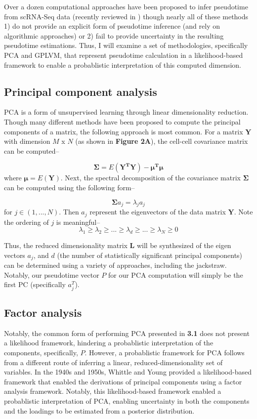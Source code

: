 \documentclass[english, 11pt]{article}\usepackage[]{graphicx}\usepackage[]{color}
\begin{document}
Over a dozen computational approaches have been proposed to infer pseudotime from scRNA-Seq data (recently reviewed in \cite{cannoodt2016computational}) though nearly all of these methods 1) do not provide an explicit form of pseudotime inference (and rely on algorithmic approaches) or 2) fail to provide uncertainty in the resulting pseudotime estimations. Thus, I will examine a set of methodologies, specifically PCA and GPLVM, that represent pseudotime calculation in a likelihood-based framework to enable a probablistic interpretation of this computed dimension.


\subsection{Principal component analysis}

PCA is a form of unsupervised learning through linear dimensionality reduction. Though many different methods have been proposed to compute the principal components of a matrix, the following approach is most common. For a matrix $\mathbf{Y}$ with dimension $M$ x $N$  (as shown in \textbf{Figure 2A}), the cell-cell covariance matrix can be computed--

$$ \mathbf{\Sigma} = E(\mathbf{Y^{T}Y}) - \mathbf{\mu^T\mu}$$
where $\mathbf{\mu} = E(\mathbf{Y})$. Next, the spectral decomposition of the covariance matrix $\mathbf{\Sigma}$ can be computed using the following form--

$$\mathbf{\Sigma} a_j = \lambda_j a_j$$
for $j \in (1, ..., N)$. Then $a_j$ represent the eigenvectors of the data matrix $\mathbf{Y}$. Note the ordering of $j$ is meaningful-- 
$$ \lambda_1 \geq \lambda_2 \geq ... \geq \lambda_d \geq ... \geq \lambda_N \geq 0$$


\noindent Thus, the reduced dimensionality matrix $\mathbf{L}$ will be synthesized of the eigen vectors $a_j$, and $d$ (the number of statistically significant principal components) can be determined using a variety of approaches, including the jackstraw. \cite{chung2015statistical} Notably, our pseudotime vector $P$ for our PCA computation will simply be the first PC (specifically $a_j^T$). 
 
 
\subsection{Factor analysis}

Notably, the common form of performing PCA presented in \textbf{3.1} does not present a likelihood framework, hindering a probablistic interpretation of the components, specifically, $P$. However, a probablistic framework for PCA follows from a different route of inferring a linear, reduced-dimensionality set of variables. \newline \newline In the 1940s and 1950s, Whittle \cite{whittle1952principal} and Young \cite{young1941maximum} provided a likelihood-based framework that enabled the derivations of principal components using a factor analysis framework. Notably, this likelihood-based framework enabled a probablistic interpretation of PCA, enabling uncertainty in both the components and the loadings to be estimated from a posterior distribution. 
\end{document}
